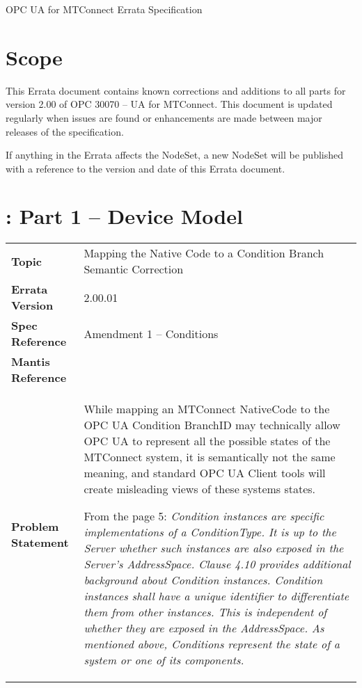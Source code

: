 \documentclass{mtc-opc}	%
\begin{document}


\glsresetall
{}

\clearpage

\begin{center}
  \Large{OPC UA for MTConnect Errata Specification}
\end{center}

\section{Scope}

This Errata document contains known corrections and additions to all parts for version 2.00 of OPC 30070 – UA for MTConnect. This document is updated regularly when issues are found or enhancements are made between major releases of the specification.

If anything in the Errata affects the NodeSet, a new NodeSet will be published with a reference to the version and date of this Errata document.

\section{\getdocnum:  Part 1 – Device Model}
\FloatBarrier

\begin{table}[ht]
  \centering 
  \tabulinesep=6pt
  \begin{tabu} to 6in {|X[0.4]|X|} \everyrow{\hline}
    \hline
    \bfseries {Topic} & {Mapping the Native Code to a Condition Branch Semantic Correction} \\
    \bfseries {Errata Version} & 2.00.01 \\
    \bfseries {Spec Reference} & {Amendment 1 – Conditions} \\
    \bfseries {Mantis Reference} &  \\
    \bfseries {Problem Statement} & \small{
      While mapping an MTConnect NativeCode to the OPC UA Condition BranchID may technically allow OPC UA to represent all the possible states of the MTConnect system, it is semantically not the same meaning, and standard OPC UA Client tools will create misleading views of these systems states.
      
      \vspace{6pt}
      From the \cite{UAPart9} page 5:
      \textit{Condition instances are specific implementations of a ConditionType. It is up to the Server whether such instances are also exposed in the Server’s AddressSpace. Clause 4.10 provides additional background about Condition instances. Condition instances shall have a unique identifier to differentiate them from other instances. This is independent of whether they are exposed in the AddressSpace. As mentioned above, Conditions represent the state of a system or one of its components.}
      } \\
  \end{tabu}
\end{table}
\end{document}
